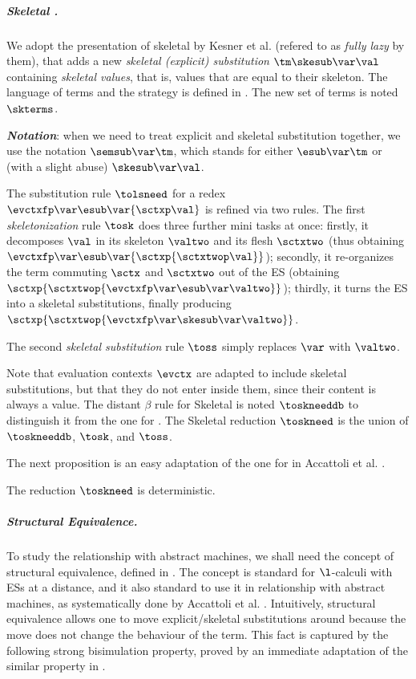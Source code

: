 \subparagraph{Skeletal \cbneed.} We adopt the presentation of skeletal \cbneed by Kesner et al. \cite{DBLP:journals/lmcs/KesnerPV24} (refered to as \emph{fully lazy \cbneed} by them), that adds a new \emph{skeletal (explicit) substitution} $\tm\skesub\var\val$ containing \emph{skeletal values}, that is, values that are equal to their skeleton. The language of terms and the strategy is defined in . The new set of terms is noted $\skterms$.

\textbf{\textit{Notation}}: when we need to treat explicit and skeletal substitution together, we use the notation $\semsub\var\tm$, which stands for either $\esub\var\tm$ or (with a slight abuse) $\skesub\var\val$.

The \cbneed substitution rule $\tolsneed$ for a redex $\evctxfp\var\esub\var{\sctxp\val}$ is refined via two rules. The first \emph{skeletonization} rule $\tosk$ does three further mini tasks at once: firstly, it decomposes $\val$ in its skeleton $\valtwo$ and its flesh $\sctxtwo$ (thus obtaining $\evctxfp\var\esub\var{\sctxp{\sctxtwop\val}}$); secondly, it re-organizes the term commuting $\sctx$ and $\sctxtwo$ out of the ES (obtaining  $\sctxp{\sctxtwop{\evctxfp\var\esub\var\valtwo}}$); thirdly, it turns the ES into a skeletal substitutions, finally producing $\sctxp{\sctxtwop{\evctxfp\var\skesub\var\valtwo}}$.

The second \emph{skeletal substitution} rule $\toss$ simply replaces $\var$ with $\valtwo$.

Note that evaluation contexts $\evctx$ are adapted to include skeletal substitutions, but that they do not enter inside them, since their content is always a value. The distant $\beta$ rule for Skeletal \cbneed is noted $\toskneeddb$ to distinguish it from the one for \cbneed. The Skeletal \cbneed reduction $\toskneed$ is the union of $\toskneeddb$, $\tosk$, and $\toss$.

The next proposition is an easy adaptation of the one for \cbneed in Accattoli et al. \cite{DBLP:conf/icfp/AccattoliBM14}.

\begin{toappendix}
\begin{proposition}
\label{skneed-determinism}
The reduction $\toskneed$ is deterministic.
\end{proposition}
\end{toappendix}


\subparagraph{Structural Equivalence.} To study the relationship with abstract machines, we shall need the concept of structural equivalence, defined in . The concept is standard for $\l$-calculi with ESs at a distance, and it also standard to use it in relationship with abstract machines, as systematically done by Accattoli et al. \cite{DBLP:conf/icfp/AccattoliBM14}. Intuitively, structural equivalence allows one to move explicit/skeletal substitutions around because the move does not change the behaviour of the term. This fact is captured by the following strong bisimulation property, proved by an immediate adaptation of the similar property in \cite{DBLP:conf/icfp/AccattoliBM14}.

